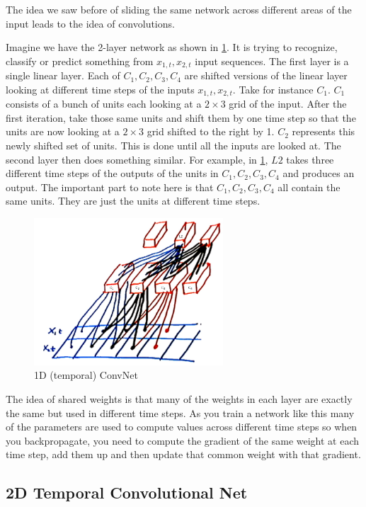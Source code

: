The idea we saw before of sliding the same network across different areas of the input leads to the idea of convolutions. 

Imagine we have the 2-layer network as shown in \cref{fig:2layer}. 
It is trying to recognize, classify or predict something from $x_{1,t}, x_{2,t}$ input sequences. 
The first layer is a single linear layer. 
Each of $C_{1}, C_{2}, C_{3}, C_{4}$ are shifted versions of the linear layer looking at different time steps of the inputs $x_{1,t}, x_{2,t}$. 
Take for instance $C_{1}$.
$C_{1}$ consists of a bunch of units each looking at a $2\times 3$ grid of the input.
After the first iteration, take those same units and shift them by one time step so that the units are now looking at a $2\times 3$ grid shifted to the right by 1.
$C_{2}$ represents this newly shifted set of units.
This is done until all the inputs are looked at.
The second layer then does something similar.
For example, in \cref{fig:2layer}, $L2$ takes three different time steps of the outputs of the units in $C_{1}, C_{2}, C_{3}, C_{4}$ and produces an output.
The important part to note here is that $C_{1}, C_{2}, C_{3}, C_{4}$ all contain the same units.
They are just the units at different time steps.

\begin{figure}
    \centering
    \includegraphics[width=200pt]{figs/conv_net.png}
    \caption{1D (temporal) ConvNet}
    \label{fig:2layer}
\end{figure}

The idea of shared weights is that many of the weights in each layer are exactly the same but used in different time steps. 
As you train a network like this many of the parameters are used to compute values across different time steps so when you backpropagate, you need to compute the gradient of the same weight at each time step, add them up and then update that common weight with that gradient.

\subsection{2D Temporal Convolutional Net}

